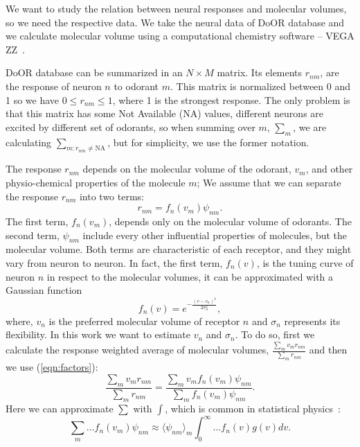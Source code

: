 \documentclass[11pt]{paper} %
\begin{document}
We want to study the relation between neural responses and molecular volumes, so we need the respective data. 
We take the neural data of DoOR database \cite{Galizia2010} and we calculate molecular volume using a computational chemistry software -- VEGA ZZ~\cite{}. 

DoOR database can be summarized in an $N\times M$ matrix. 
Its elements $r_{nm}$, are the response of neuron $n$ to odorant $m$. 
This matrix is normalized between 0 and 1 so we have $0 \le r_{nm} \le 1$, where 1 is the strongest response.
The only problem is that this matrix has some Not Available (NA) values, 
different neurons are excited by different set of odorants, 
so  when summing over $m$, $\sum_m$, we are calculating $\sum_{m: r_{nm} \neq \text{NA}}$, but for simplicity, 
we use the former notation. 

The response $r_{nm}$ depends on the molecular volume of the odorant, $v_m$, 
and other physio-chemical properties of the molecule $m$; 
We assume that we can separate the response $r_{nm}$ into two terms:
\begin{equation}
	r_{nm} = f_n(v_m) \psi_{nm}.
	\label{eqn:factors}
\end{equation}
The first term, $f_n(v_m)$, depends only on the molecular volume of odorants.
The second term, $\psi_{nm}$ include every other influential properties of molecules, but the molecular volume.
Both terms are characteristic of each receptor, and they might vary from neuron to neuron.
In fact, the first term, $f_n(v)$, is the tuning curve of neuron $n$ in respect to the molecular volumes, 
it can be approximated with a Gaussian function
\begin{equation}
	\displaystyle f_n(v) = e^{-\frac{(v-v_n)^2}{2\sigma^2_n}}, 
	\label{eqn:volume-dependence}
\end{equation}
where, $v_n$ is the preferred molecular volume of receptor $n$ and $\sigma_n$ represents its flexibility. 
In this work we want to estimate $v_n$ and $\sigma_n$. 
To do so, first we calculate the response weighted average of molecular volumes, 
$\frac{\sum_{m} v_m r_{nm}}{\sum_{m} r_{nm}}$ and then we use (\ref{eqn:factors}):
\begin{equation}
	\frac{\displaystyle \sum_{m} v_m r_{nm}}{\displaystyle \sum_{m} r_{nm}} = \frac{\displaystyle \sum_{m} v_m f_n(v_m) \psi_{nm}}{\displaystyle \sum_{m} f_n(v_m) \psi_{nm}}.
	\label{eqn:sta}
\end{equation}
Here we can approximate $\sum$ with $\int$, which is common in statistical physics~\cite{}:
\begin{equation}
	\sum_{m} \dots f_n(v_m) \psi_{nm} \approx  \langle \psi_{nm} \rangle_m \int_0^\infty \dots f_n(v) g(v)  dv. 
	\label{eqn:sigma_to_int}
\end{equation}
\end{document}
